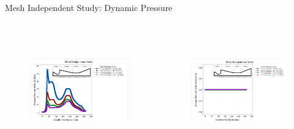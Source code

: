 \begin{frame}{Mesh Independent Study: Dynamic Pressure}
       \begin{columns}
      \begin{figure}[h]
      \centering
      \includegraphics[height=4.5cm]{images/MISdynapair.png}
      \label{fig:meshindependentstudy}
      \end{figure}
      \begin{figure}[h]
      \centering
      \includegraphics[height=4.5cm]{images/MISdynapsteam.png}
      \label{fig:meshindependentstudy}
      \end{figure}
    \end{columns}
\end{frame}

